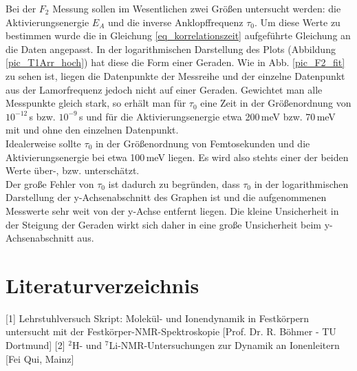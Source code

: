 Bei der $F_2$ Messung sollen im Wesentlichen zwei Größen untersucht werden: die Aktivierungsenergie $E_A$ und die inverse Anklopffrequenz $\tau_0$. Um diese Werte zu bestimmen wurde die in Gleichung \ref{eq_korrelationszeit} aufgeführte Gleichung an die Daten angepasst. In der logarithmischen Darstellung des Plots (Abbildung \ref{pic_T1Arr_hoch}) hat diese die Form einer Geraden. Wie in Abb. \ref{pic_F2_fit} zu sehen ist, liegen die Datenpunkte der Messreihe und der einzelne Datenpunkt aus der Lamorfrequenz jedoch nicht auf einer Geraden. Gewichtet man alle Messpunkte gleich stark, so erhält man für $\tau_0$ eine Zeit in der Größenordnung von $10^{-12}$\,s bzw. $10^{-9}$\,s und für die Aktivierungsenergie etwa 200\,meV bzw. 70\,meV mit und ohne den einzelnen Datenpunkt.\\
Idealerweise sollte $\tau_0$ in der Größenordnung von Femtosekunden und die Aktivierungsenergie bei etwa 100\,meV liegen. Es wird also stehts einer der beiden Werte über-, bzw. unterschätzt.\\
Der große Fehler von $\tau_0$ ist dadurch zu begründen, dass $\tau_0$ in der logarithmischen Darstellung der y-Achsenabschnitt des Graphen ist und die aufgenommenen Messwerte sehr weit von der y-Achse entfernt liegen. Die kleine Unsicherheit in der Steigung der Geraden wirkt sich daher in eine große Unsicherheit beim y-Achsenabschnitt aus.

\section*{Literaturverzeichnis}
[1] Lehrstuhlversuch Skript: Molekül- und Ionendynamik in Festkörpern
untersucht mit der Festkörper-NMR-Spektroskopie
[Prof. Dr. R. Böhmer - TU Dortmund]
[2] $^2$H- und $^7$Li-NMR-Untersuchungen zur Dynamik an Ionenleitern [Fei Qui, Mainz]





